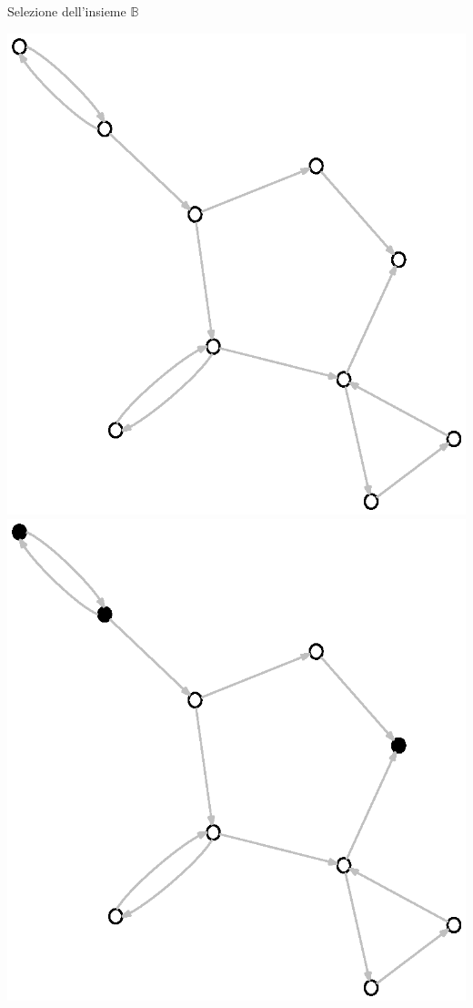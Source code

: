\documentclass{beamer}
\begin{document}
\begin{frame}{Selezione dell'insieme $\mathbb{B}$}
\begin{center} 
  \includegraphics[scale=.4]{images/presentation-input-graph-all-whites.eps}
  \includegraphics[scale=.4]{images/presentation-input-graph-with-b.eps}
\end{center}
\end{frame}
\end{document}
